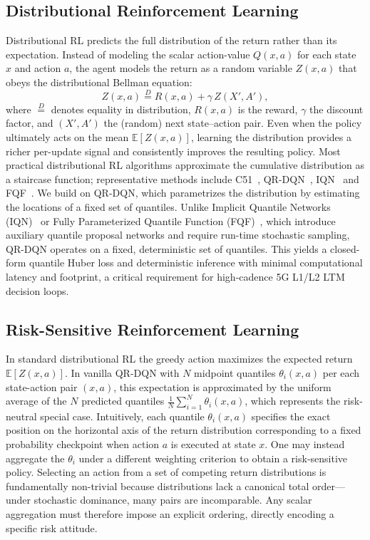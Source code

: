 \documentclass{ieeetmlcn}
\begin{document}
\subsection{Distributional Reinforcement Learning}
\label{sec:rel-distrl}
Distributional RL predicts the full distribution of the return rather than its expectation. Instead of modeling the scalar action-value $Q(x,a)$ for each state $x$ and action $a$, the agent models the return as a random variable $Z(x,a)$ that obeys the distributional Bellman equation:
\begin{equation}
Z(x,a) \overset{D}{=} R(x,a) + \gamma\,Z(X',A'),
\label{eq:dist-bellman}
\end{equation}
where $\overset{D}{=}$ denotes equality in distribution, $R(x,a)$ is the reward, $\gamma$ the discount factor, and $(X',A')$ the (random) next state--action pair.
Even when the policy ultimately acts on the mean $\mathbb{E}[Z(x,a)]$, learning the distribution provides a richer per-update signal and consistently improves the resulting policy.
Most practical distributional RL algorithms approximate the cumulative distribution as a staircase function; representative methods include C51~\cite{c51}, QR-DQN~\cite{qrdqn}, IQN~\cite{iqn} and FQF~\cite{fqf}.
We build on QR-DQN, which parametrizes the distribution by estimating the locations of a fixed set of quantiles. Unlike Implicit Quantile Networks (IQN)~\cite{iqn} or Fully Parameterized Quantile Function (FQF)~\cite{fqf}, which introduce auxiliary quantile proposal networks and require run-time stochastic sampling, QR-DQN operates on a fixed, deterministic set of quantiles. This yields a closed-form quantile Huber loss and deterministic inference with minimal computational latency and footprint, a critical requirement for high-cadence 5G L1/L2 LTM decision loops.


\subsection{Risk-Sensitive Reinforcement Learning}
\label{sec:rel-risk}
In standard distributional RL the greedy action maximizes the expected return $\mathbb{E}[Z(x,a)]$. In vanilla QR-DQN with $N$ midpoint quantiles $\theta_i(x, a)$ per each state-action pair $(x,a)$, this expectation is approximated by the uniform average of the $N$ predicted quantiles $\tfrac{1}{N}\sum_{i=1}^{N}\theta_i(x,a)$, which represents the risk-neutral special case.
Intuitively, each quantile $\theta_i(x, a)$ specifies the exact position on the horizontal axis of the return distribution corresponding to a fixed probability checkpoint when action $a$ is executed at state $x$. One may instead aggregate the $\theta_i$ under a different weighting criterion to obtain a risk-sensitive policy. Selecting an action from a set of competing return distributions is fundamentally non-trivial because distributions lack a canonical total order---under stochastic dominance, many pairs are incomparable. Any scalar aggregation must therefore impose an explicit ordering, directly encoding a specific risk attitude.
\end{document}
